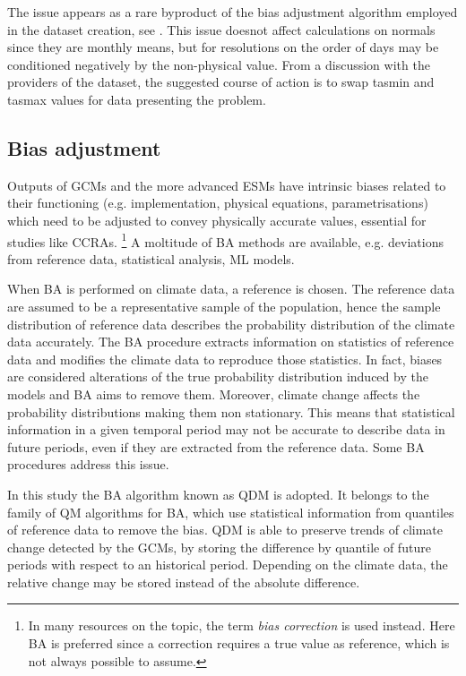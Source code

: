 The issue appears as a rare byproduct of the bias adjustment algorithm employed in the dataset creation, see \cite{2012ThrasherTechnicalNote}. This issue doesnot affect calculations on \glspl{normal} since they are monthly means, but for resolutions on the order of days may be conditioned negatively by the non-physical value.
From a discussion with the providers of the dataset, the suggested course of action is to swap \gls{tasmin} and \gls{tasmax} values for data presenting the problem.



\subsection{Bias adjustment}
Outputs of \glspl{GCM} and the more advanced \glspl{ESM} have intrinsic biases related to their functioning (e.g. implementation, physical equations, parametrisations) which need to be adjusted to convey physically accurate values, essential for studies like \glspl{CCRA}.%
\footnote{In many resources on the topic, the term \emph{bias correction} is used instead. Here \gls{BA} is preferred since a correction requires a true value as reference, which is not always possible to assume.}
A moltitude of \gls{BA} methods are available, e.g. deviations from reference data, statistical analysis, \gls{ML} models.\cite{2015CannonBiasCorrection,2010PianiStatisticalBias12,2023NiazkarBiasCorrection}

When \gls{BA} is performed on climate data, a reference is chosen. The reference data are assumed to be a representative sample of the population, hence the sample distribution of reference data describes the probability distribution of the climate data accurately. The \gls{BA} procedure extracts information on statistics of reference data and modifies the climate data to reproduce those statistics. In fact, biases are considered alterations of the true probability distribution induced by the models and \gls{BA} aims to remove them.
Moreover, climate change affects the probability distributions making them non stationary. This means that statistical information in a given temporal period may not be accurate to describe data in future periods, even if they are extracted from the reference data. Some \gls{BA} procedures address this issue.

In this study the \gls{BA} algorithm known as \gls{QDM} is adopted.\cite{2015CannonBiasCorrection} It belongs to the family of \gls{QM} algorithms for \gls{BA}, which use statistical information from quantiles of reference data to remove the bias. \Gls{QDM} is able to preserve trends of climate change detected by the \glspl{GCM}, by storing the difference by quantile of future periods with respect to an historical period. Depending on the climate data, the relative change may be stored instead of the absolute difference.

